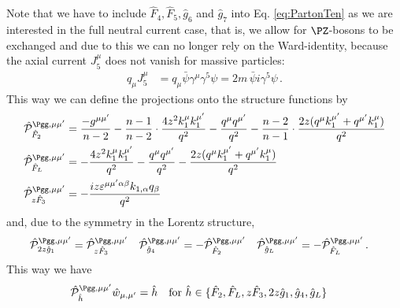Note that we have to include $\hat F_4,\hat F_5,\hat g_6$ and $\hat g_7$ into Eq. \ref{eq:PartonTen} as we are interested in the full neutral current case, that is, we allow for $\PZ$-bosons to be exchanged and due to this we can no longer rely on the Ward-identity, because the axial current $J^\mu_5$ does not vanish for massive particles:
\begin{align}
q_\mu J^{\mu}_5 &= q_\mu \bar \psi \gamma^\mu \gamma^5\psi = 2m\,\bar \psi i \gamma^5\psi\,.
\end{align}
This way we can define the projections onto the structure functions by
\begin{align}
\hat{\mathcal P}_{\hat F_2}^{\Pgg,\mu\mu'} &= \frac{-g^{\mu\mu'}}{n-2} - \frac{n-1}{n-2} \cdot \frac{4z^2 k_{1}^{\mu}k_{1}^{\mu'}}{q^2} - \frac{q^\mu q^{\mu'}}{q^2} - \frac{n-2}{n-1}\cdot \frac{2z(q^\mu k_{1}^{\mu'} + q^{\mu'}k_{1}^{\mu})}{q^2}\\
\hat{\mathcal P}_{\hat F_L}^{\Pgg,\mu\mu'} &= - \frac{4z^2 k_{1}^{\mu}k_{1}^{\mu'}}{q^2} - \frac{q^\mu q^{\mu'}}{q^2} - \frac{2z(q^\mu k_{1}^{\mu'} + q^{\mu'}k_{1}^{\mu})}{q^2}\\
\hat{\mathcal P}_{z\hat F_3}^{\Pgg,\mu\mu'} &= -\frac{i z\varepsilon^{\mu\mu'\alpha\beta}k_{1,\alpha}q_\beta}{q^2}
\end{align}
and, due to the symmetry in the Lorentz structure,
\begin{align}
\hat{\mathcal P}_{2z\hat g_1}^{\Pgg,\mu\mu'} &= \hat{\mathcal P}_{z\hat F_3}^{\Pgg,\mu\mu'}
&\hat{\mathcal P}_{\hat g_4}^{\Pgg,\mu\mu'} &= -\hat{\mathcal P}_{\hat F_2}^{\Pgg,\mu\mu'}
&\hat{\mathcal P}_{\hat g_L}^{\Pgg,\mu\mu'} &= -\hat{\mathcal P}_{\hat F_L}^{\Pgg,\mu\mu'}\,.
\end{align}
This way we have
\begin{align}
\hat{\mathcal P}_{\hat h}^{\Pgg,\mu\mu'} \hat w_{\mu,\mu'} &= \hat h\quad\text{for }\hat h\in\{\hat F_2,\hat F_L,z\hat F_3,2z\hat g_1,\hat g_4,\hat g_L\}
\end{align}

